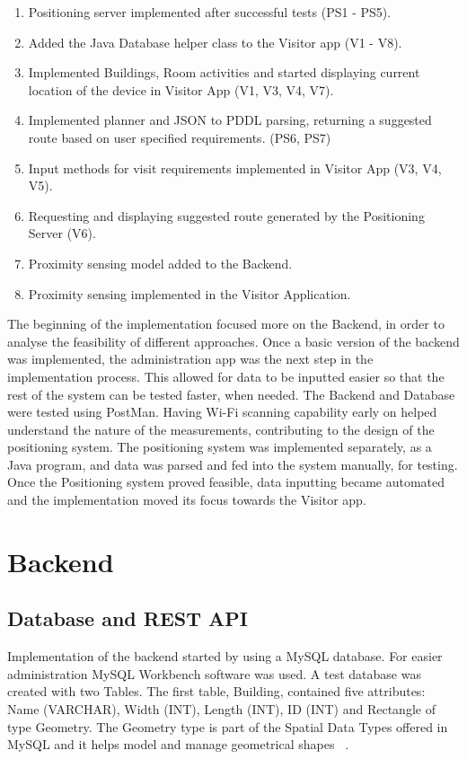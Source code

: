 \begin{enumerate}
	\item Positioning server implemented after successful tests (PS1 - PS5).
	\item Added the Java Database helper class to the Visitor app (V1 - V8).
	\item Implemented Buildings, Room activities and started displaying current location of the device in Visitor App (V1, V3, V4, V7).	
	\item Implemented planner and JSON to PDDL parsing, returning a suggested route based on user specified requirements. (PS6, PS7)
	\item Input methods for visit requirements implemented in Visitor App (V3, V4, V5).
	\item Requesting and displaying suggested route generated by the Positioning Server (V6).
	\item Proximity sensing model added to the Backend.
	\item Proximity sensing implemented in the Visitor Application.
\end{enumerate}
The beginning of the implementation focused more on the Backend, in order to analyse the feasibility of different approaches. Once a basic version of the backend was implemented, the administration app was the next step in the implementation process. This allowed for data to be inputted easier so that the rest of the system can be tested faster, when needed. The Backend and Database were tested using PostMan. Having Wi-Fi scanning capability early on helped understand the nature of the measurements, contributing to the design of the positioning system. The positioning system was implemented separately, as a Java program, and data was parsed and fed into the system manually, for testing. Once the Positioning system proved feasible, data inputting became automated and the implementation moved its focus towards the Visitor app.

\section{Backend}
\subsection{Database and REST API}
Implementation of the backend started by using a MySQL database. For easier administration MySQL Workbench software was used. A test database was created with two Tables. The first table, Building, contained five attributes: Name (VARCHAR), Width (INT), Length (INT), ID (INT) and Rectangle of type Geometry. The Geometry type is part of the Spatial Data Types offered in MySQL and it helps model and manage geometrical shapes ~\cite{MySql}.

